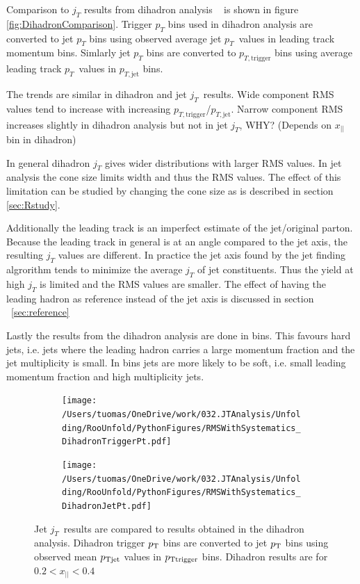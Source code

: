Comparison to $j_T$ results from dihadron analysis ~\cite{jussi} is shown in figure \ref{fig:DihadronComparison}. Trigger $p_T$ bins used in dihadron analysis are converted to jet $p_T$ bins using observed average jet $p_T$ values in leading track momentum bins. Simlarly jet $p_T$ bins are converted to $p_{T,\mathrm{trigger}}$ bins using average leading track $p_T$ values in $p_{T,\mathrm{jet}}$ bins.

The trends are similar in dihadron and jet $j_T$ results. Wide component RMS values tend to increase with increasing $p_{T,\mathrm{trigger}}$/$p_{T,\mathrm{jet}}$. Narrow component RMS increases slightly in dihadron analysis but not in jet $j_T$, WHY? (Depends on $x_{||}$ bin in dihadron)

In general dihadron $j_T$ gives wider distributions with larger RMS values. In jet analysis the cone size limits width and thus the RMS values. The effect of this limitation can be studied by changing the cone size as is described in section \ref{sec:Rstudy}.

Additionally the leading track is an imperfect estimate of the jet/original parton. Because the leading track in general is at an angle compared to the jet axis, the resulting $j_T$ values are different. In practice the jet axis found by the jet finding algrorithm tends to minimize the average $j_T$ of jet constituents. Thus the yield at high $j_T$ is limited and the RMS values are smaller. The effect of having the leading hadron as reference instead of the jet axis is discussed in section ~\ref{sec:reference}

Lastly the results from the dihadron analysis are done in  bins. This favours hard jets, i.e. jets where the leading hadron carries a large momentum fraction and the jet multiplicity is small. In  bins jets are more likely to be soft, i.e. small leading momentum fraction and high multiplicity jets.



\begin{figure}[htb]
\begin{subfigure}{0.5\textwidth}
\texttt{[image: /Users/tuomas/OneDrive/work/032.JTAnalysis/Unfolding/RooUnfold/PythonFigures/RMSWithSystematics\_DihadronTriggerPt.pdf]}
\end{subfigure}
\begin{subfigure}{0.5\textwidth}
\texttt{[image: /Users/tuomas/OneDrive/work/032.JTAnalysis/Unfolding/RooUnfold/PythonFigures/RMSWithSystematics\_DihadronJetPt.pdf]}
\end{subfigure}
\caption{Jet $j_T$ results are compared to results obtained in the dihadron analysis. Dihadron trigger $p_{\rm T}$ bins are converted to jet $p_{\rm T}$  bins  using observed mean  $p_{\rm Tjet}$ values in $p_{\rm Ttrigger}$ bins. Dihadron results are for $0.2 < x_{||} < 0.4$}
\label{fig:dihadroncomparison}
\end{figure}

